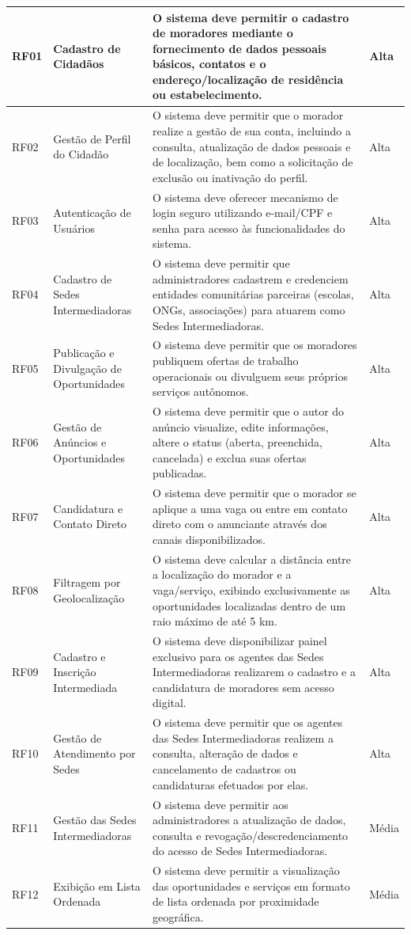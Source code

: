 \documentclass[
    12pt,
    oneside,
    a4paper,
    brazil
]{abntex2}
\begin{document}
\begin{xltabular}{\textwidth}{>{\raggedright\arraybackslash}p{1.2cm} >{\raggedright\arraybackslash}p{2.7cm} X >{\raggedleft\arraybackslash}p{2cm}}
    RF01 & Cadastro de Cidadãos & O sistema deve permitir o cadastro de moradores mediante o fornecimento de dados pessoais básicos, contatos e o endereço/localização de residência ou estabelecimento. & Alta \\ \hline
    RF02 & Gestão de Perfil do Cidadão & O sistema deve permitir que o morador realize a gestão de sua conta, incluindo a consulta, atualização de dados pessoais e de localização, bem como a solicitação de exclusão ou inativação do perfil. & Alta \\ \hline
    RF03 & Autenticação de Usuários & O sistema deve oferecer mecanismo de login seguro utilizando e-mail/CPF e senha para acesso às funcionalidades do sistema. & Alta \\ \hline
    RF04 & Cadastro de Sedes Intermediadoras & O sistema deve permitir que administradores cadastrem e credenciem entidades comunitárias parceiras (escolas, ONGs, associações) para atuarem como Sedes Intermediadoras. & Alta \\ \hline
    RF05 & Publicação e Divulgação de Oportunidades & O sistema deve permitir que os moradores publiquem ofertas de trabalho operacionais ou divulguem seus próprios serviços autônomos. & Alta \\ \hline
    RF06 & Gestão de Anúncios e Oportunidades & O sistema deve permitir que o autor do anúncio visualize, edite informações, altere o status (aberta, preenchida, cancelada) e exclua suas ofertas publicadas. & Alta \\ \hline
    RF07 & Candidatura e Contato Direto & O sistema deve permitir que o morador se aplique a uma vaga ou entre em contato direto com o anunciante através dos canais disponibilizados. & Alta \\ \hline
    RF08 & Filtragem por Geolocalização & O sistema deve calcular a distância entre a localização do morador e a vaga/serviço, exibindo exclusivamente as oportunidades localizadas dentro de um raio máximo de até 5 km. & Alta \\ \hline
    RF09 & Cadastro e Inscrição Intermediada & O sistema deve disponibilizar painel exclusivo para os agentes das Sedes Intermediadoras realizarem o cadastro e a candidatura de moradores sem acesso digital. & Alta \\ \hline
    RF10 & Gestão de Atendimento por Sedes & O sistema deve permitir que os agentes das Sedes Intermediadoras realizem a consulta, alteração de dados e cancelamento de cadastros ou candidaturas efetuados por elas. & Alta \\ \hline
    RF11 & Gestão das Sedes Intermediadoras & O sistema deve permitir aos administradores a atualização de dados, consulta e revogação/descredenciamento do acesso de Sedes Intermediadoras. & Média \\ \hline
    RF12 & Exibição em Lista Ordenada & O sistema deve permitir a visualização das oportunidades e serviços em formato de lista ordenada por proximidade geográfica. & Média \\
\end{xltabular}
\end{document}
